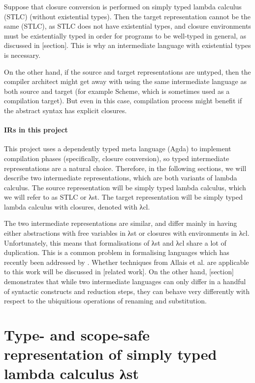 \documentclass[bsc,frontabs,twoside,singlespacing,parskip,deptreport]{infthesis}
\theoremstyle{definition}
\begin{document}
Suppose that closure conversion is performed on simply typed lambda
calculus (STLC) (without existential types). Then the target representation
cannot be the same (STLC), as STLC does not have existential types,
and closure environments must be existentially typed in order for
programs to be well-typed in general, as discussed in [section]. This
is why an intermediate language with existential types is necessary.

On the other hand, if the source and target representations are
untyped, then the compiler architect might get away with using the
same intermediate language as both source and target (for example
Scheme, which is sometimes used as a compilation target). But even
in this case, compilation process might benefit if the abstract syntax
has explicit closures.

\paragraph{IRs in this project} This project uses a dependently typed
meta language (Agda) to implement compilation phases (specifically,
closure conversion), so typed intermediate representations are a
natural choice. Therefore, in the following sections, we will describe
two intermediate representations, which are both variants of lambda
calculus. The source representation will be simply typed lambda
calculus, which we will refer to as STLC or λst. The target
representation will be simply typed lambda calculus with closures,
denoted with λcl.

The two intermediate representations are similar, and differ mainly in
having either abstractions with free variables in λst or closures with
environments in λcl. Unfortunately, this means that formalisations of
λst and λcl share a lot of duplication. This is a common problem in
formalising languages which has recently been addressed by
\cite{DBLP:journals/pacmpl/AllaisA0MM18}. Whether techniques from
Allais et al. are applicable to this work will be discussed in [related
work]. On the other hand, [section] demonstrates that while two
intermediate languages can only differ in a handful of syntactic
constructs and reduction steps, they can behave very differently with
respect to the ubiquitious operations of renaming and substitution.

\section{Type- and scope-safe representation of simply typed lambda
  calculus λst}
\end{document}
